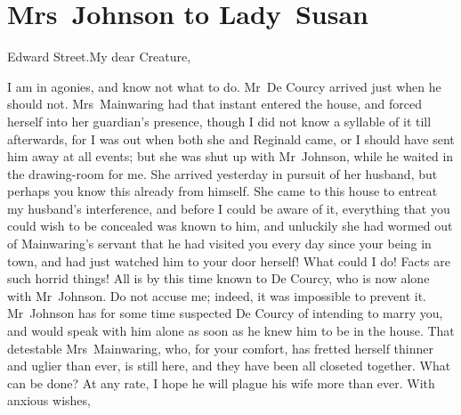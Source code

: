 \chapter{Mrs~Johnson to Lady~Susan}
  
  	\begin{a4}
	\vspace{5em}
	\end{a4}
	
  \begin{mail}{Edward Street.}{My dear Creature,}
 
 I am in agonies, and know not what to do. Mr~De Courcy arrived just when he should not. Mrs~Mainwaring had that instant entered the house, and forced herself into her guardian's presence, though I did not know a syllable of it till afterwards, for I was out when both she and Reginald came, or I should have sent him away at all events; but she was shut up with Mr~Johnson, while he waited in the drawing-room for me. She arrived yesterday in pursuit of her husband, but perhaps you know this already from himself. She came to this house to entreat my husband's interference, and before I could be aware of it, everything that you could wish to be concealed was known to him, and unluckily she had wormed out of Mainwaring's servant that he had visited you every day since your being in town, and had just watched him to your door herself! What could I do! Facts are such horrid things! All is by this time known to De Courcy, who is now alone with Mr~Johnson. Do not accuse me; indeed, it was impossible to prevent it. Mr~Johnson has for some time suspected De Courcy of intending to marry you, and would speak with him alone as soon as he knew him to be in the house. That detestable Mrs~Mainwaring, who, for your comfort, has fretted herself thinner and uglier than ever, is still here, and they have been all closeted together. What can be done? At any rate, I hope he will plague his wife more than ever. With anxious wishes, 

\end{mail}